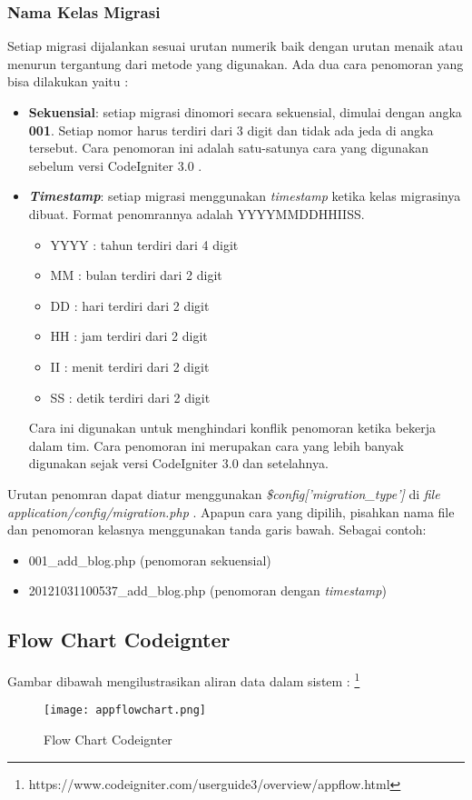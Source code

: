 \subsubsection{Nama Kelas Migrasi}
Setiap migrasi dijalankan sesuai urutan numerik baik dengan urutan menaik atau menurun tergantung dari metode yang digunakan. Ada dua cara penomoran yang bisa dilakukan yaitu :
\begin{itemize}
	\item \textbf{Sekuensial}: setiap migrasi dinomori secara sekuensial, dimulai dengan angka \textbf{001}. Setiap nomor harus terdiri dari 3 digit dan tidak ada jeda di angka tersebut. Cara penomoran ini adalah satu-satunya cara yang digunakan sebelum versi CodeIgniter 3.0 . \cite{CodeIgniter:17}
	\item \textbf{\textit{Timestamp}}: setiap migrasi menggunakan \textit{timestamp} ketika kelas migrasinya dibuat. Format penomrannya adalah YYYYMMDDHHIISS.
		\begin{itemize}
		\item YYYY	: tahun terdiri dari 4 digit
		\item MM	: bulan terdiri dari 2 digit
		\item DD	: hari terdiri dari 2 digit
		\item HH	: jam terdiri dari 2 digit
		\item II	: menit terdiri dari 2 digit
		\item SS	: detik terdiri dari 2 digit
		\end{itemize}
Cara ini digunakan untuk menghindari konflik penomoran ketika bekerja dalam tim. Cara penomoran ini merupakan cara yang lebih banyak digunakan sejak versi CodeIgniter 3.0 dan setelahnya. \cite{CodeIgniter:17}
\end{itemize}
Urutan penomran dapat diatur menggunakan \textit{\$config['migration\_type']} di \textit{file} \textit{application/config/migration.php} . Apapun cara yang dipilih, pisahkan nama file dan penomoran kelasnya menggunakan tanda garis bawah. Sebagai contoh: \cite{CodeIgniter:17}
\begin{itemize}
	\item 001\_add\_blog.php (penomoran sekuensial)
	\item 20121031100537\_add\_blog.php (penomoran dengan \textit{timestamp})
\end{itemize}

\subsection{Flow Chart Codeignter}
Gambar dibawah mengilustrasikan aliran data dalam sistem : \footnote{https://www.codeigniter.com/userguide3/overview/appflow.html} 
\begin{figure} [H]
	\centering  
	\texttt{[image: appflowchart.png]}  
	\caption[Flow Chart Codeignter]{Flow Chart Codeignter} 
	\label{fig:flow-chart-CodeIgniter} 
\end{figure}

